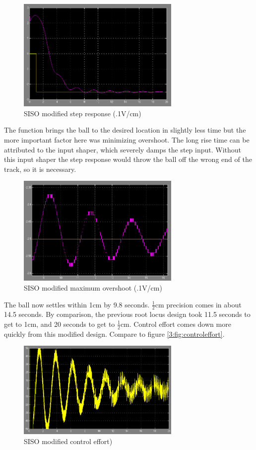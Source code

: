 \begin{figure}[ht]
	\centering
		\includegraphics[width=0.70\textwidth]{pics/sisostep}
	\caption{SISO modified step response (.1V/cm)}
	\label{3:fig:sisostep}
\end{figure}

The function brings the ball to the desired location in slightly less time but the more important factor here was minimizing overshoot. The long rise time can be attributed to the input shaper, which severely damps the step input. Without this input shaper the step response would throw the ball off the wrong end of the track, so it is necessary.

\begin{figure}[ht]
	\centering
		\includegraphics[width=0.70\textwidth]{pics/sisots}
	\caption{SISO modified maximum overshoot (.1V/cm)}
	\label{3:fig:sisots}
\end{figure}

The ball now settles within 1cm by 9.8 seconds. $\frac{1}{2}$cm precision comes in about 14.5 seconds. By comparison, the previous root locus design took 11.5 seconds to get to 1cm, and 20 seconds to get to $\frac{1}{2}$cm. Control effort comes down more quickly from this modified design. Compare to figure \ref{3:fig:controleffort}.

\begin{figure}[ht]
	\centering
		\includegraphics[width=0.70\textwidth]{pics/sisoce}
	\caption{SISO modified control effort)}
	\label{3:fig:sisoce}
\end{figure}

\clearpage